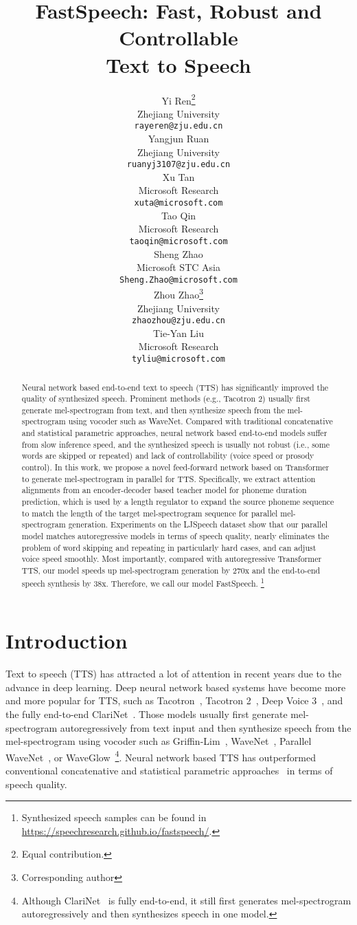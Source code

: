 \documentclass{article}
\title{FastSpeech: Fast, Robust and Controllable \\Text to Speech}
\author{
  Yi Ren\thanks{Equal contribution.}  \\
  Zhejiang University\\
  \texttt{rayeren@zju.edu.cn} \\
\And
   Yangjun Ruan\footnotemark[1] \\
  Zhejiang University\\
  \texttt{ruanyj3107@zju.edu.cn} \\
  \And
  Xu Tan  \\
  Microsoft Research \\
  \texttt{xuta@microsoft.com} \\
   \And
  Tao Qin \\ 
  Microsoft Research \\
  \texttt{taoqin@microsoft.com} \\
  \And
  Sheng Zhao \\
  Microsoft STC Asia \\
  \texttt{Sheng.Zhao@microsoft.com} \\
   \And
  Zhou Zhao\thanks{Corresponding author} \\
  Zhejiang University \\
  \texttt{zhaozhou@zju.edu.cn} \\
   \And
  Tie-Yan Liu \\
  Microsoft Research \\
  \texttt{tyliu@microsoft.com} \\
}
\begin{document}
\maketitle

\begin{abstract}
Neural network based end-to-end text to speech (TTS) has significantly improved the quality of synthesized speech. Prominent methods (e.g., Tacotron 2) usually first generate mel-spectrogram from text, and then synthesize speech from the mel-spectrogram using vocoder such as WaveNet. Compared with traditional concatenative and statistical parametric approaches, neural network based end-to-end models suffer from slow inference speed, and the synthesized speech is usually not robust (i.e., some words are skipped or repeated) and lack of controllability (voice speed or prosody control). In this work, we propose a novel feed-forward network based on Transformer to generate mel-spectrogram in parallel for TTS. Specifically, we extract attention alignments from an encoder-decoder based teacher model for phoneme duration prediction, which is used by a length regulator to expand the source phoneme sequence to match the length of the target mel-spectrogram sequence for parallel mel-spectrogram generation. Experiments on the LJSpeech dataset show that our parallel model matches autoregressive models in terms of speech quality, nearly eliminates the problem of word skipping and repeating in particularly hard cases, and can adjust voice speed smoothly. Most importantly, compared with autoregressive Transformer TTS, our model speeds up mel-spectrogram generation by 270x and the end-to-end speech synthesis by 38x. Therefore, we call our model FastSpeech. \footnote{Synthesized speech samples can be found in \url{https://speechresearch.github.io/fastspeech/}.}
\end{abstract}

\section{Introduction}
Text to speech (TTS) has attracted a lot of attention in recent years due to the advance in deep learning. Deep neural network based systems have become more and more popular for TTS, such as Tacotron~\citep{wang2017tacotron}, Tacotron 2~\citep{shen2018natural}, Deep Voice 3~\citep{ping2018deep}, and the fully end-to-end ClariNet~\citep{ping2018clarinet}. Those models usually first generate mel-spectrogram autoregressively from text input and then synthesize speech from the mel-spectrogram using vocoder such as Griffin-Lim~\citep{griffin1984signal}, WaveNet~\citep{van2016wavenet}, Parallel WaveNet~\citep{oord2017parallel}, or WaveGlow~\citep{prenger2019waveglow}\footnote{Although ClariNet~\citep{ping2018clarinet} is fully end-to-end, it still first generates mel-spectrogram autoregressively and then synthesizes speech in one model.}. Neural network based TTS has outperformed conventional concatenative and statistical parametric approaches~\citep{hunt1996unit, wu2016merlin} in terms of speech quality. 
\end{document}

